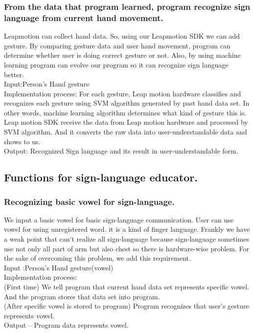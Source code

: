 \documentclass[10pt,journal,compsoc]{IEEEtran}
\begin{document}
\subsubsection {From the data that program learned, program recognize sign language from current hand movement.\\}
Leapmotion can collect hand data. So, using our Leapmotion SDK we can add gesture. By comparing gesture data and user hand movement, program can determine whether user is doing correct gesture or not. Also, by using machine learning program can evolve our program so it can recognize sign language better.
\\Input:Person's Hand gesture
\\Implementation process: For each gesture, Leap motion hardware classifies and recognizes each gesture using SVM algorithm generated by past hand data set. In other words, machine learning algorithm determines what kind of gesture this is. Leap motion SDK receive the data from Leap motion hardware and processed by SVM algorithm. And it converts the raw data into user-understandable data and shows to us.
\\Output: Recognized Sign language and its result in user-understandable form.

\subsection{Functions for sign-language educator.\\}

\subsubsection {Recognizing basic vowel for sign-language.\\}

We input a basic vowel for basic sign-language communication. User can use vowel for using unregistered word. it is a kind of finger language. Frankly we have a weak point that can`t realize all sign-language because sign-language sometimes use not only all part of arm but also chest so there is hardware-wise problem. For the sake of overcoming this problem, we add this requirement.
\\Input :Person's Hand gesture(vowel)
\\Implementation process:
\\(First time) We tell program that current hand data set represents specific vowel. And the program stores that data set into program.
\\(After specific vowel is stored to program) Program recognizes that user’s gesture represents vowel.
\\Output – Program data represents vowel.
\end{document}
